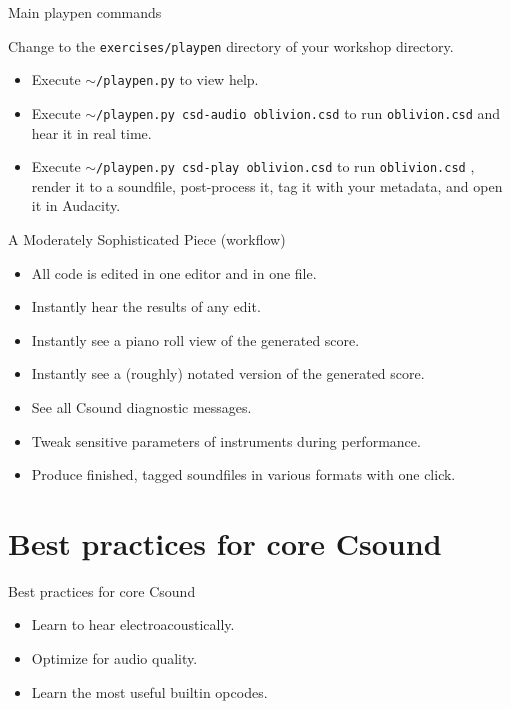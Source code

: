 \documentclass{beamer}
\begin{document}
\begin{frame}{Main playpen commands}
\begin{example}
Change to the \texttt{exercises/playpen} directory of your workshop directory.
\begin{itemize}
\item Execute \texttt{$\sim$/playpen.py} to view help.
\item Execute \texttt{$\sim$/playpen.py csd-audio oblivion.csd} to run \texttt{oblivion.csd} and hear it in real time.
\item Execute \texttt{$\sim$/playpen.py csd-play oblivion.csd} to run \texttt{oblivion.csd} , render it to a soundfile, post-process it, tag it with your metadata, and open it in Audacity.
\end{itemize}
\end{example}
\end{frame}

\begin{frame}{A Moderately Sophisticated Piece (workflow)}
\begin{itemize}
\item All code is edited in one editor and in one file.
\item Instantly hear the results of any edit.
\item Instantly see a piano roll view of the generated score.
\item Instantly see a (roughly) notated version of the generated score.
\item See all Csound diagnostic messages.
\item Tweak sensitive parameters of instruments during performance.
\item Produce finished, tagged soundfiles in various formats with one click.
\end{itemize}
\end{frame}

\section{Best practices for core Csound}
\begin{frame}{Best practices for core Csound}
\begin{itemize}
\item Learn to hear electroacoustically.
\item Optimize for audio quality.
\item Learn the most useful builtin opcodes.
\end{itemize}
\end{frame}
\end{document}
